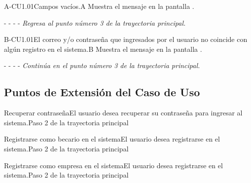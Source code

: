 	\begin{UCtrayectoriaA}{A-CU1.01}{Campos vacíos.}{A}
	    \UCpaso[\UCsist]Muestra el mensaje en la pantalla .
	    \item[- -] - - {\em Regresa al punto número 3 de la trayectoria principal.}
	\end{UCtrayectoriaA}
	
	\begin{UCtrayectoriaA}{B-CU1.01}{El correo y/o contraseña que ingresados por el usuario no coincide con algún registro en el sistema.}{B}
		\UCpaso[\UCsist] Muestra el mensaje  en la pantalla .
		\item [- -] - - {\em Continúa en el punto número 3 de la trayectoria principal.}
	\end{UCtrayectoriaA}
	
	
	\subsection{Puntos de Extensión del Caso de Uso}
	
	\begin{UCExtenssionPoint}{Recuperar contraseña}{El usuario desea recuperar su contraseña para ingresar al sistema.}{Paso 2 de la trayectoria principal}{} 
	\end{UCExtenssionPoint}
	
	\begin{UCExtenssionPoint}{Registrarse como becario en el sistema}{El usuario desea registrarse en el sistema.}{Paso 2 de la trayectoria principal}{} 
	\end{UCExtenssionPoint}
	
	\begin{UCExtenssionPoint}{Registrarse como empresa en el sistema}{El usuario desea registrarse en el sistema.}{Paso 2 de la trayectoria principal}{} 
	\end{UCExtenssionPoint}

